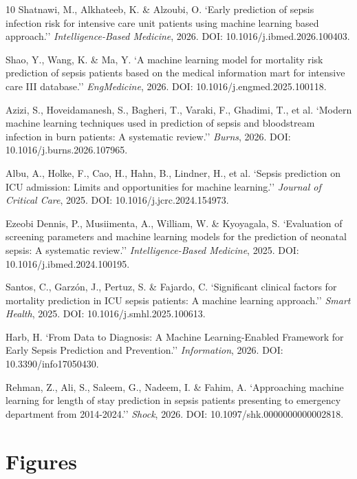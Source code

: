 \documentclass[11pt,a4paper]{article}
\begin{document}
\begin{thebibliography}{10}
Shatnawi, M., Alkhateeb, K. \& Alzoubi, O. `Early prediction of sepsis infection risk for intensive care unit patients using machine learning based approach.'' \textit{Intelligence-Based Medicine}, 2026. DOI: 10.1016/j.ibmed.2026.100403.

Shao, Y., Wang, K. \& Ma, Y. `A machine learning model for mortality risk prediction of sepsis patients based on the medical information mart for intensive care III database.'' \textit{EngMedicine}, 2026. DOI: 10.1016/j.engmed.2025.100118.

Azizi, S., Hoveidamanesh, S., Bagheri, T., Varaki, F., Ghadimi, T., et al. `Modern machine learning techniques used in prediction of sepsis and bloodstream infection in burn patients: A systematic review.'' \textit{Burns}, 2026. DOI: 10.1016/j.burns.2026.107965.

Albu, A., Holke, F., Cao, H., Hahn, B., Lindner, H., et al. `Sepsis prediction on ICU admission: Limits and opportunities for machine learning.'' \textit{Journal of Critical Care}, 2025. DOI: 10.1016/j.jcrc.2024.154973.

Ezeobi Dennis, P., Musiimenta, A., William, W. \& Kyoyagala, S. `Evaluation of screening parameters and machine learning models for the prediction of neonatal sepsis: A systematic review.'' \textit{Intelligence-Based Medicine}, 2025. DOI: 10.1016/j.ibmed.2024.100195.

Santos, C., Garz\'on, J., Pertuz, S. \& Fajardo, C. `Significant clinical factors for mortality prediction in ICU sepsis patients: A machine learning approach.'' \textit{Smart Health}, 2025. DOI: 10.1016/j.smhl.2025.100613.

Harb, H. `From Data to Diagnosis: A Machine Learning-Enabled Framework for Early Sepsis Prediction and Prevention.'' \textit{Information}, 2026. DOI: 10.3390/info17050430.

Rehman, Z., Ali, S., Saleem, G., Nadeem, I. \& Fahim, A. `Approaching machine learning for length of stay prediction in sepsis patients presenting to emergency department from 2014-2024.'' \textit{Shock}, 2026. DOI: 10.1097/shk.0000000000002818.

\end{thebibliography}


\section*{Figures}
\end{document}
